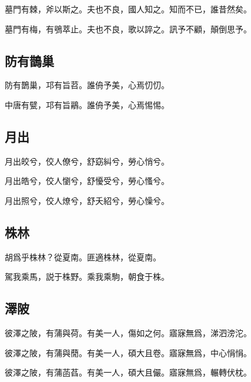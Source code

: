 墓門有棘，斧以斯之。夫也不良，國人知之。知而不已，誰昔然矣。

墓門有梅，有鴞萃止。夫也不良，歌以誶之。訊予不顧，顛倒思予。

\subsection[防有鵲巢]{防有鵲巢}

防有鵲巢，邛有旨苕。誰侜予美，心焉忉忉。

中唐有甓，邛有旨鷊。誰侜予美，心焉惕惕。

\subsection[月出]{月出}

月出皎兮，佼人僚兮，舒窈糾兮，勞心悄兮。

月出皓兮，佼人懰兮，舒懮受兮，勞心慅兮。

月出照兮，佼人燎兮，舒夭紹兮，勞心懆兮。

\subsection[株林]{株林}

胡爲乎株林？從夏南。匪適株林，從夏南。

駕我乘馬，説于株野。乘我乘駒，朝食于株。

\subsection[澤陂]{澤陂}

彼澤之陂，有蒲與荷。有美一人，傷如之何。寤寐無爲，涕泗滂沱。

彼澤之陂，有蒲與蕑。有美一人，碩大且卷。寤寐無爲，中心悁悁。

彼澤之陂，有蒲菡萏。有美一人，碩大且儼。寤寐無爲，輾轉伏枕。
